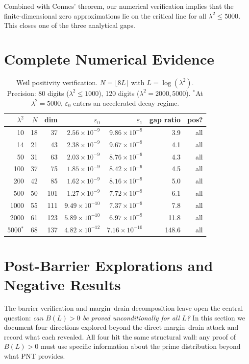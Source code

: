 \documentclass[11pt,a4paper]{article}
\begin{document}
Combined with Connes' theorem, our numerical verification implies that the finite-dimensional zero approximations lie on the critical line for all $\lambda^2 \leq 5000$. This closes one of the three analytical gaps.

\section{Complete Numerical Evidence}

\begin{table}[h]
\centering
\begin{tabular}{rrrrrrr}
\toprule
$\lambda^2$ & $N$ & dim & $\varepsilon_0$ & $\varepsilon_1$ & gap ratio & pos? \\
\midrule
10 & 18 & 37 & $2.56 \times 10^{-9}$ & $9.86 \times 10^{-9}$ & 3.9 & all \\
14 & 21 & 43 & $2.38 \times 10^{-9}$ & $9.67 \times 10^{-9}$ & 4.1 & all \\
50 & 31 & 63 & $2.03 \times 10^{-9}$ & $8.76 \times 10^{-9}$ & 4.3 & all \\
100 & 37 & 75 & $1.85 \times 10^{-9}$ & $8.42 \times 10^{-9}$ & 4.5 & all \\
200 & 42 & 85 & $1.62 \times 10^{-9}$ & $8.16 \times 10^{-9}$ & 5.0 & all \\
500 & 50 & 101 & $1.27 \times 10^{-9}$ & $7.72 \times 10^{-9}$ & 6.1 & all \\
1000 & 55 & 111 & $9.49 \times 10^{-10}$ & $7.37 \times 10^{-9}$ & 7.8 & all \\
2000 & 61 & 123 & $5.89 \times 10^{-10}$ & $6.97 \times 10^{-9}$ & 11.8 & all \\
5000$^*$ & 68 & 137 & $4.82 \times 10^{-12}$ & $7.16 \times 10^{-10}$ & 148.6 & all \\
\bottomrule
\end{tabular}
\caption{Weil positivity verification. $N = \lfloor 8L \rceil$ with $L = \log(\lambda^2)$. Precision: 80 digits ($\lambda^2 \leq 1000$), 120 digits ($\lambda^2 = 2000, 5000$). $^*$At $\lambda^2 = 5000$, $\varepsilon_0$ enters an accelerated decay regime.}
\end{table}

\section{Post-Barrier Explorations and Negative Results}\label{sec:post-barrier}

The barrier verification and margin--drain decomposition leave open the central question: \emph{can $B(L) > 0$ be proved unconditionally for all $L$?} In this section we document four directions explored beyond the direct margin--drain attack and record what each revealed. All four hit the same structural wall: any proof of $B(L) > 0$ must use specific information about the prime distribution beyond what PNT provides.
\end{document}
